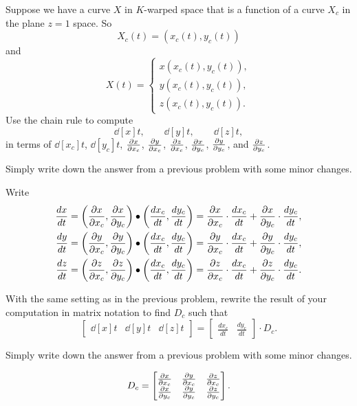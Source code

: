 \documentclass{ximera}
\begin{document}
\begin{problem}
Suppose we have a curve $X$ in $K$-warped space that is a function of
a curve $X_c$ in the plane $z=1$ space. So
\[
X_c(t) = \left( x_c(t),y_c(t)\right)
\]
and
\[
X(t) = 
\begin{cases}
  x(x_c(t),y_c(t)),\\
  y(x_c(t),y_c(t)),\\
  z(x_c(t),y_c(t)).
\end{cases}
\]
Use the chain rule to compute
\[
\dd[x]{t}, \qquad \dd[y]{t}, \qquad \dd[z]{t},
\]
in terms of $\dd[x_c]{t}$, $\dd[y_c]{t}$, $\pp[x]{x_c}$,
$\pp[y]{x_c}$, $\pp[z]{x_c}$, $\pp[x]{y_c}$, $\pp[y]{y_c}$,
and $\pp[z]{y_c}$.
  \begin{hint}
  Simply write down the answer from a previous problem with some minor
  changes.
  \end{hint}
  \begin{freeResponse}
  Write
  \begin{align*}
    \dd[x]{t} &= \left(\pp[x]{x_c},\pp[x]{y_c}\right)\bullet\left(\dd[x_c]{t},\dd[y_c]{t}\right) = \pp[x]{x_c}\cdot\dd[x_c]{t}+\pp[x]{y_c}\cdot\dd[y_c]{t}, \\
    \dd[y]{t} &= \left(\pp[y]{x_c},\pp[y]{y_c}\right)\bullet\left(\dd[x_c]{t},\dd[y_c]{t}\right) = \pp[y]{x_c}\cdot\dd[x_c]{t}+\pp[y]{y_c}\cdot\dd[y_c]{t}, \\
    \dd[z]{t} &= \left(\pp[z]{x_c},\pp[z]{y_c}\right)\bullet\left(\dd[x_c]{t},\dd[y_c]{t}\right) = \pp[z]{x_c}\cdot\dd[x_c]{t}+\pp[z]{y_c}\cdot\dd[y_c]{t}.  
  \end{align*}
\end{freeResponse}
\end{problem}




\begin{problem}
  With the same setting as in the previous problem, rewrite the result
  of your computation in matrix notation to find $D_c$
  such that
\[
\begin{bmatrix}
\dd[x]{t} & \dd[y]{t} & \dd[z]{t}
\end{bmatrix}
=
\begin{bmatrix}
\frac{dx_c}{dt} & \frac{dy_c}{dt}
\end{bmatrix}\cdot D_c.
\]
\begin{hint}
  Simply write down the answer from a previous problem with some minor
  changes.
\end{hint}
\begin{freeResponse}
  \[
  D_c =
  \begin{bmatrix}
    \pp[x]{x_c} & \pp[y]{x_c} & \pp[z]{x_c} \\
    \pp[x]{y_c}   & \pp[y]{y_c}   & \pp[z]{y_c}
  \end{bmatrix}.
  \]
\end{freeResponse}
\end{problem}
\end{document}
